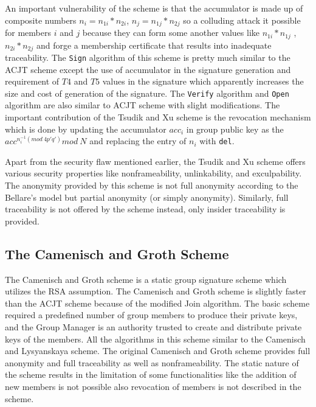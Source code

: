 An important vulnerability of the scheme is that the accumulator is made up of composite numbers $n_i = n_{1i} * n_{2i}$, $n_j = n_{1j} * n_{2j}$ so a colluding attack it possible for members $i$ and $j$ because they can form some another values like $n_{1i} * n_{1j}$ , $n_{2i} * n_{2j}$ and forge a membership certificate that results into inadequate traceability. The \texttt{Sign} algorithm of this scheme is pretty much similar to the ACJT scheme except the use of accumulator in the signature generation and requirement of $T4$ and $T5$ values in the signature which apparently increases the size and cost of generation of the signature. The \texttt{Verify} algorithm and \texttt{Open} algorithm are also similar to ACJT scheme with slight modifications. The important contribution of the Tsudik and Xu scheme is the revocation mechanism which is done by updating the accumulator $acc_i$ in group public key as the $acc^{n_{i}^{-1} (mod~4 p\prime q\prime)} mod~N$ and replacing the entry of $n_i$ with \texttt{del}.

Apart from the security flaw mentioned earlier, the Tsudik and Xu scheme offers various security properties like nonframeability, unlinkability, and exculpability. The anonymity provided by this scheme is not full anonymity according to the  Bellare's model but partial anonymity (or simply anonymity). Similarly, full traceability is not offered by the scheme instead, only insider traceability is provided.

\subsection{The Camenisch and Groth Scheme}\label{CG}
The Camenisch and Groth scheme is a static group signature scheme which utilizes the RSA assumption\cite{camenisch2004group}. The Camenisch and Groth scheme is slightly faster than the ACJT scheme because of the modified Join algorithm. The basic scheme required a predefined number of group members to produce their private keys, and the Group Manager is an authority trusted to create and distribute private keys of the members. All the algorithms in this scheme similar to the Camenisch and Lysyanskaya scheme\cite{camenisch2002dynamic}. The original Camenisch and Groth scheme provides full anonymity and full traceability as well as nonframeability. The static nature of the scheme results in the limitation of some functionalities like the addition of new members is not possible also revocation of members is not described in the scheme. 

